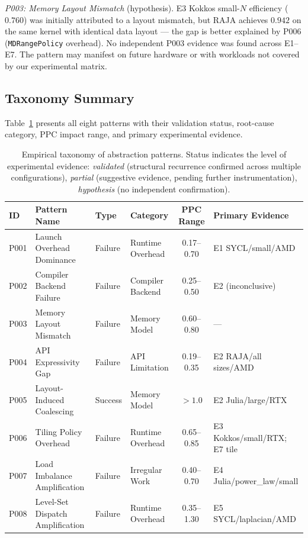 \textit{P003: Memory Layout Mismatch} (hypothesis).
E3 Kokkos small-$N$ efficiency ($0.760$) was initially attributed to a layout
mismatch, but RAJA achieves $0.942$ on the same kernel with identical data
layout --- the gap is better explained by P006 (\texttt{MDRangePolicy}
overhead). No independent P003 evidence was found across E1--E7. The pattern
may manifest on future hardware or with workloads not covered by our
experimental matrix.

\subsection{Taxonomy Summary}
\label{subsec:taxonomy_summary}

Table~\ref{tab:taxonomy_summary} presents all eight patterns with their
validation status, root-cause category, PPC impact range, and primary
experimental evidence.

\begin{table}[t]
\centering
\caption{Empirical taxonomy of abstraction patterns. Status indicates
the level of experimental evidence: \textit{validated} (structural
recurrence confirmed across multiple configurations), \textit{partial}
(suggestive evidence, pending further instrumentation), \textit{hypothesis}
(no independent confirmation).}
\label{tab:taxonomy_summary}
\begin{tabular}{llllcl}
\hline
\textbf{ID} & \textbf{Pattern Name} & \textbf{Type} & \textbf{Category}
& \textbf{PPC Range} & \textbf{Primary Evidence} \\
\hline
P001 & Launch Overhead Dominance      & Failure  & Runtime Overhead
     & 0.17--0.70 & E1 SYCL/small/AMD \\
P002 & Compiler Backend Failure       & Failure  & Compiler Backend
     & 0.25--0.50 & E2 (inconclusive) \\
P003 & Memory Layout Mismatch         & Failure  & Memory Model
     & 0.60--0.80 & --- \\
P004 & API Expressivity Gap           & Failure  & API Limitation
     & 0.19--0.35 & E2 RAJA/all sizes/AMD \\
P005 & Layout-Induced Coalescing      & Success  & Memory Model
     & $> 1.0$    & E2 Julia/large/RTX \\
P006 & Tiling Policy Overhead         & Failure  & Runtime Overhead
     & 0.65--0.85 & E3 Kokkos/small/RTX; E7 tile \\
P007 & Load Imbalance Amplification   & Failure  & Irregular Work
     & 0.40--0.70 & E4 Julia/power\_law/small \\
P008 & Level-Set Dispatch Amplification & Failure & Runtime Overhead
     & 0.35--1.30 & E5 SYCL/laplacian/AMD \\
\hline
\end{tabular}
\end{table}

